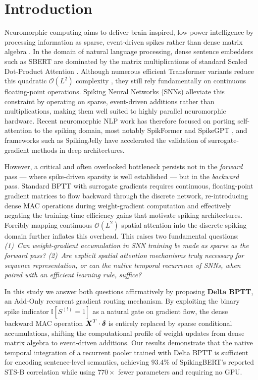 \documentclass[11pt, conference, compsoc, twoside]{IEEEtran}
\begin{document}
\section{Introduction}

Neuromorphic computing aims to deliver brain-inspired, low-power intelligence by processing information as sparse, event-driven spikes rather than dense matrix algebra \cite{roy2019towards}. In the domain of natural language processing, dense sentence embedders such as SBERT \cite{reimers2019sentence} are dominated by the matrix multiplications of standard Scaled Dot-Product Attention \cite{vaswani2017attention}. Although numerous efficient Transformer variants reduce this quadratic $\mathcal{O}(L^2)$ complexity \cite{tay2022efficient}, they still rely fundamentally on continuous floating-point operations. Spiking Neural Networks (SNNs) alleviate this constraint by operating on sparse, event-driven additions rather than multiplications, making them well suited to highly parallel neuromorphic hardware. Recent neuromorphic NLP work has therefore focused on porting self-attention to the spiking domain, most notably SpikFormer \cite{zhou2023spikformer} and SpikeGPT \cite{zhu2023spikegpt}, and frameworks such as SpikingJelly \cite{fang2023spikingjelly} have accelerated the validation of surrogate-gradient methods in deep architectures.

However, a critical and often overlooked bottleneck persists not in the \textit{forward} pass --- where spike-driven sparsity is well established --- but in the \textit{backward} pass. Standard BPTT with surrogate gradients \cite{neftci2019surrogate} requires continuous, floating-point gradient matrices to flow backward through the discrete network, re-introducing dense MAC operations during weight-gradient computation and effectively negating the training-time efficiency gains that motivate spiking architectures. Forcibly mapping continuous $\mathcal{O}(L^2)$ spatial attention into the discrete spiking domain further inflates this overhead. This raises two fundamental questions: \textit{(1)~Can weight-gradient accumulation in SNN training be made as sparse as the forward pass? (2)~Are explicit spatial attention mechanisms truly necessary for sequence representation, or can the native temporal recurrence of SNNs, when paired with an efficient learning rule, suffice?}

In this study we answer both questions affirmatively by proposing \textbf{Delta BPTT}, an Add-Only recurrent gradient routing mechanism. By exploiting the binary spike indicator $\mathbb{I}[S^{(t)} = 1]$ as a natural gate on gradient flow, the dense backward MAC operation $\boldsymbol{X}^T \cdot \boldsymbol{\delta}$ is entirely replaced by sparse conditional accumulations, shifting the computational profile of weight updates from dense matrix algebra to event-driven additions. Our results demonstrate that the native temporal integration of a recurrent pooler trained with Delta BPTT is sufficient for encoding sentence-level semantics, achieving $93.4\%$ of SpikingBERT's reported STS-B correlation \cite{bal2024spikingbert} while using $770\times$ fewer parameters and requiring no GPU.
\end{document}
